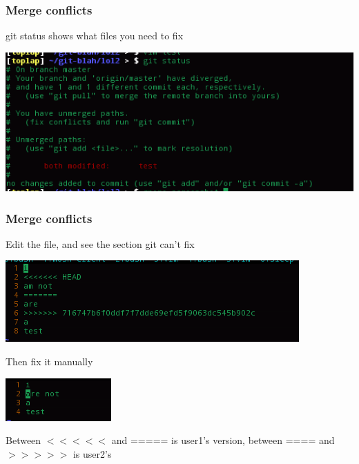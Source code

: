 \documentclass[xcolor=dvipsnames]{beamer}
\begin{document}
\begin{frame}
    \frametitle{Merge conflicts}

    git status shows what files you need to fix

    \begin{center}
        \includegraphics[scale=0.4]{mergeconflict2.png}
    \end{center}
\end{frame}
 
\begin{frame}
    \frametitle{Merge conflicts}

    Edit the file, and see the section git can't fix

    \begin{center}
        \includegraphics[scale=0.4]{mergeconflict3.png}
    \end{center}

    Then fix it manually

    \begin{center}
        \includegraphics[scale=0.4]{mergeconflict4.png}
    \end{center}

    Between $<<<<<$ and ===== is user1's version, between ==== and $>>>>>$ is user2's
\end{frame}
\end{document}

